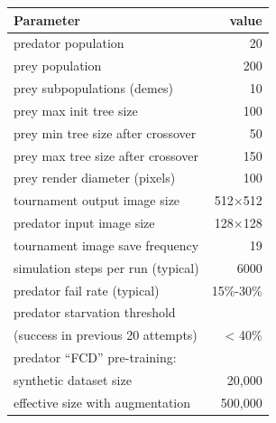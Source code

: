 \documentclass[acmtog]{acmart}
\begin{document}
\begin{adjustwidth}{1cm}{0cm}
    \vspace{0.3cm}
    \begin{tabular}{ |l|r| }
        \hline
        \textbf{Parameter} & \textbf{value} \\ 
        \hline
        predator population & 20 \\ 
        prey population & 200 \\ 
        prey subpopulations (demes) & 10 \\
        prey max init tree size & 100 \\
        prey min tree size after crossover & 50 \\
        prey max tree size after crossover & 150 \\
        \hline
        prey render diameter (pixels) & 100 \\ 
        tournament output image size & 512×512 \\ 
        predator input image size & 128×128 \\ 
        \hline
        tournament image save frequency & 19 \\
        simulation steps per run (typical) & 6000 \\
        predator fail rate (typical) & 15\%-30\% \\
        predator starvation threshold & \\
        \hspace{0.2cm}(success in previous 20 attempts) & < 40\% \\ 
        \hline
        predator “FCD” pre-training: & \\
        \hspace{0.2cm} synthetic dataset size & 20,000 \\
        \hspace{0.2cm} effective size with augmentation & 500,000 \\
        \hline
    \end{tabular}
\end{adjustwidth}
\end{document}
